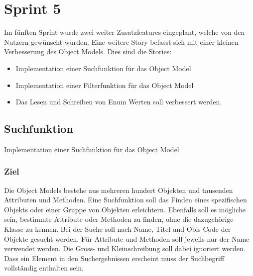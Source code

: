 \section{Sprint 5}
Im fünften Sprint wurde zwei weiter Zusatzfeatures eingeplant, welche von den Nutzern gewünscht wurden.
Eine weitere Story befasst sich mit einer kleinen Verbesserung des Object Models.
Dies sind die Stories:
\begin{itemize}
   \item Implementation einer Suchfunktion für das Object Model
   \item Implementation einer Filterfunktion für das Object Model
   \item Das Lesen und Schreiben von Enum Werten soll verbessert werden.
\end{itemize}

\subsection{Suchfunktion}
\dq Implementation einer Suchfunktion für das Object Model\dq
\subsubsection{Ziel}
Die Object Models bestehe aus mehreren hundert Objekten und tausenden Attributen und Methoden.
Eine Suchfunktion soll das Finden eines spezifischen Objekts oder einer Gruppe von Objekten erleichtern.
Ebenfalls soll es mögliche sein, bestimmte Attribute oder Methoden zu finden, ohne die dazugehörige Klasse zu kennen.
Bei der Suche soll nach Name, Titel und Obis Code der Objekte gesucht werden.
Für Attribute und Methoden soll jeweils nur der Name verwendet werden.
Die Gross- und Kleinschreibung soll dabei ignoriert werden.
Dass ein Element in den Suchergebnissen erscheint muss der Suchbegriff vollständig enthalten sein.

